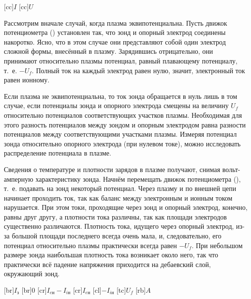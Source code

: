 [cc]{$I$}
[cc]{$U$}


Рассмотрим вначале случай, когда плазма эквипотенциальна. Пусть движок потенциометра () установлен так, что зонд и
опорный электрод соединены накоротко. Ясно, что в этом случае они представляют собой один электрод сложной формы,
внесённый в плазму. Зарядившись отрицательно, они принимают относительно плазмы потенциал, равный плавающему потенциалу,
т.~е. $-U_f$. Полный ток на каждый электрод равен нулю, значит, электронный ток равен ионному.

Если плазма не эквипотенциальна, то ток зонда обращается в нуль лишь в том случае, если потенциалы зонда и опорного
электрода смещены на величину $U_f$ относительно потенциалов соответствующих участков плазмы. Необходимая для этого
разность потенциалов между зондом и опорным электродом равна разности потенциалов между соответствующими участками
плазмы. Измеряя потенциал зонда относительно опорного электрода (при нулевом токе), можно исследовать распределение
потенциала в плазме.

Сведения о температуре и плотности зарядов в плазме получают, снимая вольт-амперную характеристику зонда. Начнём
перемещать движок потенциометра (), т.~е. подавать на зонд некоторый потенциал. Через плазму и по внешней цепи
начинает проходить ток, так как баланс между электронным и ионным током нарушается. При этом
токи, проходящие через зонд и опорный электрод, конечно, равны друг другу, а плотности тока различны, так как площади
электродов существенно различаются. Плотность тока, идущего через опорный электрод, из-за большой площади последнего
всегда очень мала, и, следовательно, его потенциал относительно плазмы практически всегда равен $-U_f$. При небольшом
размере зонда наибольшая плотность тока возникает около него, так что практически всё падение напряжения приходится на
дебаевский слой, окружающий зонд.

[br]{$I_з$}
[br]{0}
[cr]{$I_{eн}-I_{iн}$}
[cr]{$I_{eн}$}
[cl]{$-I_{iн}$}
[tc]{$U_f$}
[rb]{$A$}

